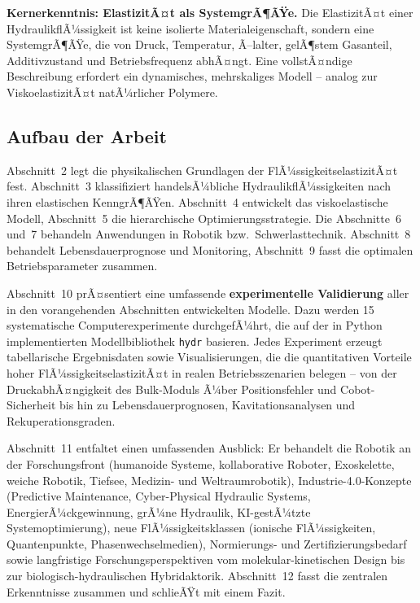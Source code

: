 ﻿\documentclass[a4paper,12pt]{scrreprt}
\theoremstyle{definition}
\begin{document}
\begin{infobox}
\textbf{Kernerkenntnis: ElastizitÃ¤t als SystemgrÃ¶ÃŸe.}
Die ElastizitÃ¤t einer HydraulikflÃ¼ssigkeit ist keine isolierte Materialeigenschaft,
sondern eine SystemgrÃ¶ÃŸe, die von Druck, Temperatur, Ã–lalter, gelÃ¶stem Gasanteil,
Additivzustand und Betriebsfrequenz abhÃ¤ngt. Eine vollstÃ¤ndige Beschreibung
erfordert ein dynamisches, mehrskaliges Modell -- analog zur ViskoelastizitÃ¤t
natÃ¼rlicher Polymere.
\end{infobox}

\subsection{Aufbau der Arbeit}

Abschnitt~2 legt die physikalischen Grundlagen der FlÃ¼ssigkeitselastizitÃ¤t
fest. Abschnitt~3 klassifiziert handelsÃ¼bliche HydraulikflÃ¼ssigkeiten nach
ihren elastischen KenngrÃ¶ÃŸen. Abschnitt~4 entwickelt das viskoelastische
Modell, Abschnitt~5 die hierarchische Optimierungsstrategie. Die
Abschnitte~6 und~7 behandeln Anwendungen in Robotik bzw.\
Schwerlasttechnik. Abschnitt~8 behandelt Lebensdauerprognose und Monitoring,
Abschnitt~9 fasst die optimalen Betriebsparameter zusammen.

Abschnitt~10 prÃ¤sentiert eine umfassende
\textbf{experimentelle Validierung} aller in den vorangehenden Abschnitten
entwickelten Modelle. Dazu werden 15 systematische Computerexperimente
durchgefÃ¼hrt, die auf der in Python implementierten Modellbibliothek
\texttt{hydr} basieren. Jedes Experiment erzeugt tabellarische Ergebnisdaten
sowie Visualisierungen, die die quantitativen Vorteile hoher FlÃ¼ssigkeitselastizitÃ¤t
in realen Betriebsszenarien belegen -- von der DruckabhÃ¤ngigkeit des
Bulk-Moduls Ã¼ber Positionsfehler und Cobot-Sicherheit bis hin zu
Lebensdauerprognosen, Kavitationsanalysen und Rekuperationsgraden.

Abschnitt~11 entfaltet einen umfassenden Ausblick: Er behandelt die Robotik
an der Forschungsfront (humanoide Systeme, kollaborative Roboter, Exoskelette,
weiche Robotik, Tiefsee, Medizin- und Weltraumrobotik), Industrie-4.0-Konzepte
(Predictive Maintenance, Cyber-Physical Hydraulic Systems, EnergierÃ¼ckgewinnung,
grÃ¼ne Hydraulik, KI-gestÃ¼tzte Systemoptimierung), neue FlÃ¼ssigkeitsklassen
(ionische FlÃ¼ssigkeiten, Quantenpunkte, Phasenwechselmedien), Normierungs-
und Zertifizierungsbedarf sowie langfristige Forschungsperspektiven vom
molekular-kinetischen Design bis zur biologisch-hydraulischen Hybridaktorik.
Abschnitt~12 fasst die zentralen Erkenntnisse zusammen und schlieÃŸt
mit einem Fazit.
\end{document}

